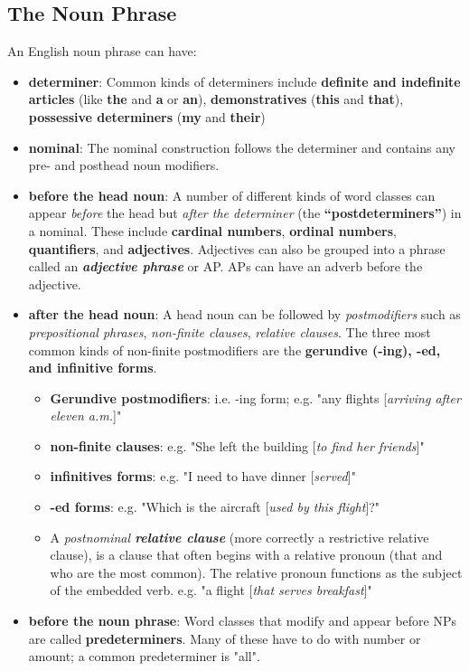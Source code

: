 \documentclass[11pt]{article}
\begin{document}
\subsection{The Noun Phrase}
An English noun phrase can have:
\begin{itemize}
\item \textbf{determiner}: Common kinds of determiners include \textbf{definite and indefinite articles} (like \textbf{the} and \textbf{a} or \textbf{an}), \textbf{demonstratives} (\textbf{this} and \textbf{that}), \textbf{possessive determiners} (\textbf{my} and \textbf{their})
\item \textbf{nominal}: The nominal construction follows the determiner and contains any pre- and posthead noun modifiers. 
\item \textbf{before the head noun}: A number of different kinds of word classes can appear \emph{before} the head  but \emph{after the determiner} (the \textbf{“postdeterminers”}) in a nominal. These include \textbf{cardinal numbers}, \textbf{ordinal numbers}, \textbf{quantifiers}, and \textbf{adjectives}. Adjectives can also be grouped into a phrase called an \emph{\textbf{adjective phrase}} or AP. APs can have an adverb before the adjective.
\item \textbf{after the head noun}:  A head noun can be followed by \emph{postmodifiers} such as \emph{prepositional phrases}, \emph{non-finite clauses}, \emph{relative clauses}. The three most common kinds of non-finite postmodifiers are the \textbf{gerundive (-ing), -ed, and infinitive forms}.
\begin{itemize}
\item \textbf{Gerundive postmodifiers}: i.e. -ing form;  e.g. "any flights [\emph{arriving after eleven a.m.}]" 
\item \textbf{non-finite clauses}: e.g. "She left the building [\emph{to find her friends}]"
\item \textbf{infinitives forms}: e.g. "I need to have dinner [\emph{served}]"
\item \textbf{-ed forms}: e.g. "Which is the aircraft [\emph{used by this flight}]?"
\item A \emph{postnominal \textbf{relative clause}} (more correctly a restrictive relative clause), is a clause that often begins with a relative pronoun (that and who are the most common). The relative pronoun functions as the subject of the embedded verb. e.g. "a flight [\emph{that serves breakfast}]"
\end{itemize}
\item \textbf{before the noun phrase}:  Word classes that modify and appear before NPs are called \textbf{predeterminers}. Many of these have to do with number or amount; a common predeterminer is "all".

\end{itemize}
\end{document}

